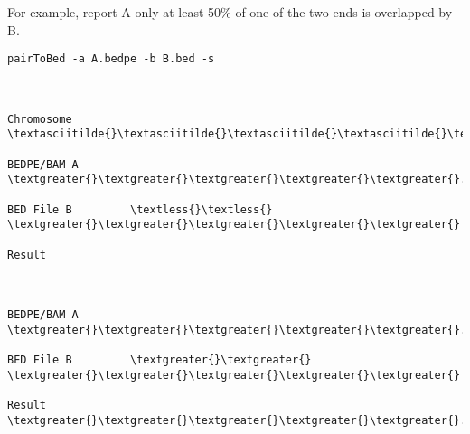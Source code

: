 \documentclass[letterpaper,10pt,english]{sphinxmanual}
\begin{document}
For example, report A only at least 50\% of one of the two ends is overlapped by B.

\begin{Verbatim}[commandchars=\\\{\}]
pairToBed -a A.bedpe -b B.bed -s



Chromosome  \textasciitilde{}\textasciitilde{}\textasciitilde{}\textasciitilde{}\textasciitilde{}\textasciitilde{}\textasciitilde{}\textasciitilde{}\textasciitilde{}\textasciitilde{}\textasciitilde{}\textasciitilde{}\textasciitilde{}\textasciitilde{}\textasciitilde{}\textasciitilde{}\textasciitilde{}\textasciitilde{}\textasciitilde{}\textasciitilde{}\textasciitilde{}\textasciitilde{}\textasciitilde{}\textasciitilde{}\textasciitilde{}\textasciitilde{}\textasciitilde{}\textasciitilde{}\textasciitilde{}\textasciitilde{}\textasciitilde{}\textasciitilde{}\textasciitilde{}\textasciitilde{}\textasciitilde{}\textasciitilde{}\textasciitilde{}\textasciitilde{}\textasciitilde{}\textasciitilde{}\textasciitilde{}\textasciitilde{}\textasciitilde{}\textasciitilde{}\textasciitilde{}\textasciitilde{}\textasciitilde{}\textasciitilde{}\textasciitilde{}\textasciitilde{}\textasciitilde{}\textasciitilde{}\textasciitilde{}\textasciitilde{}\textasciitilde{}\textasciitilde{}\textasciitilde{}\textasciitilde{}\textasciitilde{}\textasciitilde{}\textasciitilde{}\textasciitilde{}\textasciitilde{}\textasciitilde{}

BEDPE/BAM A         \textgreater{}\textgreater{}\textgreater{}\textgreater{}\textgreater{}.................................\textless{}\textless{}\textless{}\textless{}\textless{}

BED File B         \textless{}\textless{}                                           \textgreater{}\textgreater{}\textgreater{}\textgreater{}\textgreater{}

Result



BEDPE/BAM A         \textgreater{}\textgreater{}\textgreater{}\textgreater{}\textgreater{}.................................\textless{}\textless{}\textless{}\textless{}\textless{}

BED File B         \textgreater{}\textgreater{}                                          \textgreater{}\textgreater{}\textgreater{}\textgreater{}\textgreater{}

Result              \textgreater{}\textgreater{}\textgreater{}\textgreater{}\textgreater{}.................................\textless{}\textless{}\textless{}\textless{}\textless{}
\end{Verbatim}
\end{document}
